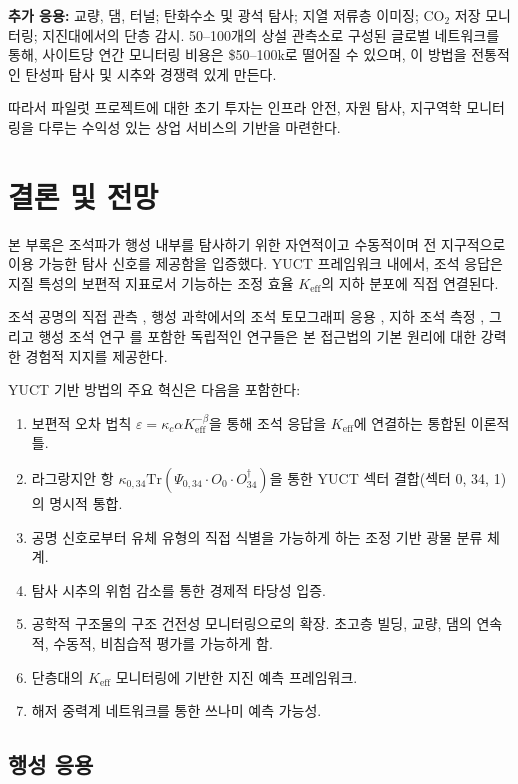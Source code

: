 \documentclass[12pt,a4paper]{article}
\theoremstyle{remark}
\newcommand{\Keff}{K_{\mathrm{eff}}}
\newcommand{\kappac}{\kappa_c}
\newcommand{\eps}{\varepsilon}
\begin{document}
	\textbf{추가 응용:} 교량, 댐, 터널; 탄화수소 및 광석 탐사; 지열 저류층 이미징; CO$_2$ 저장 모니터링; 지진대에서의 단층 감시. 50–100개의 상설 관측소로 구성된 글로벌 네트워크를 통해, 사이트당 연간 모니터링 비용은 \$50–100k로 떨어질 수 있으며, 이 방법을 전통적인 탄성파 탐사 및 시추와 경쟁력 있게 만든다.
	
	따라서 파일럿 프로젝트에 대한 초기 투자는 인프라 안전, 자원 탐사, 지구역학 모니터링을 다루는 수익성 있는 상업 서비스의 기반을 마련한다.
	
	\section{결론 및 전망}
	\label{sec:conclusion}
	
	본 부록은 조석파가 행성 내부를 탐사하기 위한 자연적이고 수동적이며 전 지구적으로 이용 가능한 탐사 신호를 제공함을 입증했다. YUCT 프레임워크 내에서, 조석 응답은 지질 특성의 보편적 지표로서 기능하는 조정 효율 \(\Keff\)의 지하 분포에 직접 연결된다.
	
	조석 공명의 직접 관측 \cite{Sibgatulin2014}, 행성 과학에서의 조석 토모그래피 응용 \cite{RoviraNavarro2025}, 지하 조석 측정 \cite{Rogister2024}, 그리고 행성 조석 연구 \cite{Briaud2025}를 포함한 독립적인 연구들은 본 접근법의 기본 원리에 대한 강력한 경험적 지지를 제공한다.
	
	YUCT 기반 방법의 주요 혁신은 다음을 포함한다:
	
	\begin{enumerate}
		\item 보편적 오차 법칙 \(\eps = \kappac \alpha \Keff^{-\beta}\)을 통해 조석 응답을 \(\Keff\)에 연결하는 통합된 이론적 틀.
		\item 라그랑지안 항 \(\kappa_{0,34} \mathrm{Tr}(\Psi_{0,34} \cdot O_0 \cdot O_{34}^\dagger)\)을 통한 YUCT 섹터 결합(섹터 0, 34, 1)의 명시적 통합.
		\item 공명 신호로부터 유체 유형의 직접 식별을 가능하게 하는 조정 기반 광물 분류 체계.
		\item 탐사 시추의 위험 감소를 통한 경제적 타당성 입증.
		\item 공학적 구조물의 구조 건전성 모니터링으로의 확장. 초고층 빌딩, 교량, 댐의 연속적, 수동적, 비침습적 평가를 가능하게 함.
		\item 단층대의 \(K_{\mathrm{eff}}\) 모니터링에 기반한 지진 예측 프레임워크.
		\item 해저 중력계 네트워크를 통한 쓰나미 예측 가능성.
	\end{enumerate}
	
	\subsection{행성 응용}
	
\end{document}
